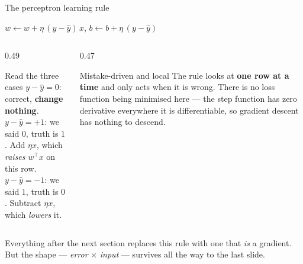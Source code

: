 \documentclass[aspectratio=169]{beamer}
\begin{document}
\begin{frame}[shrink=4]{The perceptron learning rule}
  \begin{exampleblock}{}
    \centering\large
    $w \leftarrow w + \eta\,(y - \hat y)\,x$, \qquad
    $b \leftarrow b + \eta\,(y - \hat y)$
  \end{exampleblock}
  \begin{columns}[T]
    \begin{column}{0.49\textwidth}
      \begin{block}{Read the three cases}
        $y - \hat y = 0$: correct, \textbf{change nothing}.\\[0.2em]
        $y - \hat y = +1$: we said $0$, truth is $1$. Add $\eta x$, which
        \emph{raises} $w^\top x$ on this row.\\[0.2em]
        $y - \hat y = -1$: we said $1$, truth is $0$. Subtract $\eta x$,
        which \emph{lowers} it.
      \end{block}
    \end{column}
    \begin{column}{0.47\textwidth}
      \begin{alertblock}{Mistake-driven and local}
        The rule looks at \textbf{one row at a time} and only acts when it is
        wrong. There is no loss function being minimised here --- the step
        function has zero derivative everywhere it is differentiable, so
        gradient descent has nothing to descend.
      \end{alertblock}
    \end{column}
  \end{columns}
  \vspace{0.2em}
  \begin{center}\small
    Everything after the next section replaces this rule with one that
    \emph{is} a gradient. But the shape --- \emph{error} $\times$
    \emph{input} --- survives all the way to the last slide.
  \end{center}
\end{frame}
\end{document}
